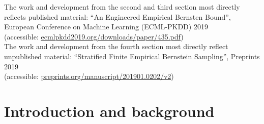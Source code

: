 The work and development from the second and third section most directly reflects published material: ``An Engineered Empirical Bernsten Bound'',\\ European Conference on Machine Learning (ECML-PKDD) 2019\\(accessible: \href{http://ecmlpkdd2019.org/downloads/paper/435.pdf}{ecmlpkdd2019.org/downloads/paper/435.pdf})\\
The work and development from the fourth section most directly reflect unpublished material: ``Stratified Finite Empirical Bernstein Sampling'', Preprints 2019\\
(accessible: \href{preprints.org/manuscript/201901.0202/v2}{preprints.org/manuscript/201901.0202/v2})\\







\section{Introduction and background}\label{sec:sampling_background}


